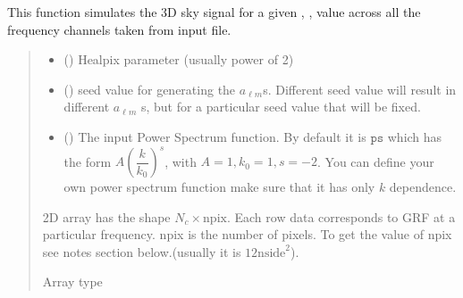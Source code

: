 \documentclass[a4paper,11pt,oneside,english,openany]{sphinxmanual}
\begin{document}
\begin{fulllineitems}
\label{\detokenize{simvis:simvis.sky3dgrf}}
\pysigstartsignatures
{}
\pysigstopsignatures
\sphinxAtStartPar
This function simulates the 3D sky signal for a given , ,  value across all the frequency channels taken from  input  file.
\begin{quote}\begin{description}
\begin{itemize}
\item {} 
\sphinxAtStartPar
{} () \textendash{} Healpix parameter (usually power of 2)

\item {} 
\sphinxAtStartPar
{} () \textendash{} seed value for generating the \(a_{\ell m}\)\textquotesingle{}s. Different seed value will result in different \(a_{\ell m}\) \textquotesingle{}s, but for a particular seed value that will be fixed.

\item {} 
\sphinxAtStartPar
{} () \textendash{} The input Power Spectrum function. By default it is \(\texttt{ps}\) which has the form \(A \left(\dfrac{k}{k_0}\right)^{s}\), with \(A=1, k_0=1, s=-2\).
You can define your own power spectrum function make sure that it has only  \(k\) dependence.

\end{itemize}

\sphinxAtStartPar
2D array has the shape \(N_c \times \text{npix}\). Each row data corresponds to GRF at a particular frequency. npix is the number of pixels. To get the value of npix see notes section below.(usually it is \(12\text{nside}^2\)).

\sphinxAtStartPar
Array type


\end{description}
\end{quote}
\end{fulllineitems}
\end{document}
